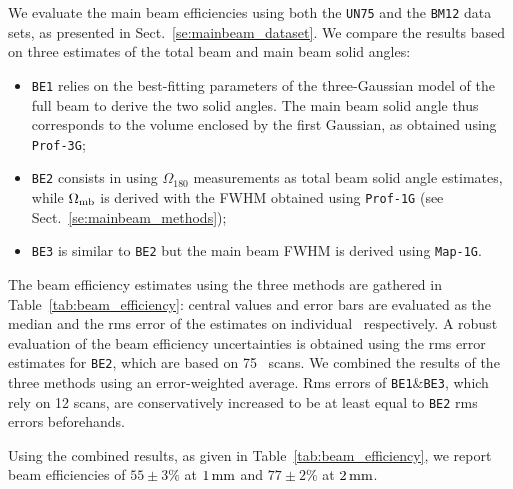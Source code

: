 We evaluate the main beam efficiencies using both the {\tt UN75} and
the {\tt BM12} data sets, as presented in
Sect.~\ref{se:mainbeam_dataset}. We compare the results based on three
estimates of the total beam and main beam solid angles: 
\begin{itemize}
  \item{{\tt BE1} relies on the best-fitting parameters of the
    three-Gaussian model of the full beam to derive the two solid
    angles. The main beam solid angle thus corresponds to the volume
    enclosed by the first Gaussian, as obtained using {\tt Prof-3G};}
  \item{{\tt BE2} consists in using $\Omega_{180}$ measurements as
    total beam solid angle estimates, while $\Omega_{\rm{mb}}$ is
    derived with the FWHM obtained using {\tt Prof-1G} (see
    Sect.~\ref{se:mainbeam_methods});}
  \item{{\tt BE3} is similar to {\tt BE2} but the main beam FWHM is
    derived using {\tt Map-1G}.}  
\end{itemize}

The beam efficiency estimates using the three methods are gathered
in Table~\ref{tab:beam_efficiency}: central values and error
bars are evaluated as the median and the rms error of the
estimates on individual \bms\ respectively. A robust evaluation of the
beam efficiency uncertainties is obtained using the rms error estimates
for {\tt BE2}, which are based on 75 \bm\ scans. We combined the
results of the three methods using an error-weighted average. Rms
errors of {\tt BE1$\&$BE3}, which rely on 12 scans, are conservatively
increased to be at least equal to {\tt BE2} rms errors beforehands.

Using the combined results, as given in
Table~\ref{tab:beam_efficiency}, we report beam efficiencies of
$55 \pm 3 \%$ at $1\,\rm{mm}$ and  $77 \pm 2 \%$ at $2\,\rm{mm}$. 
  

